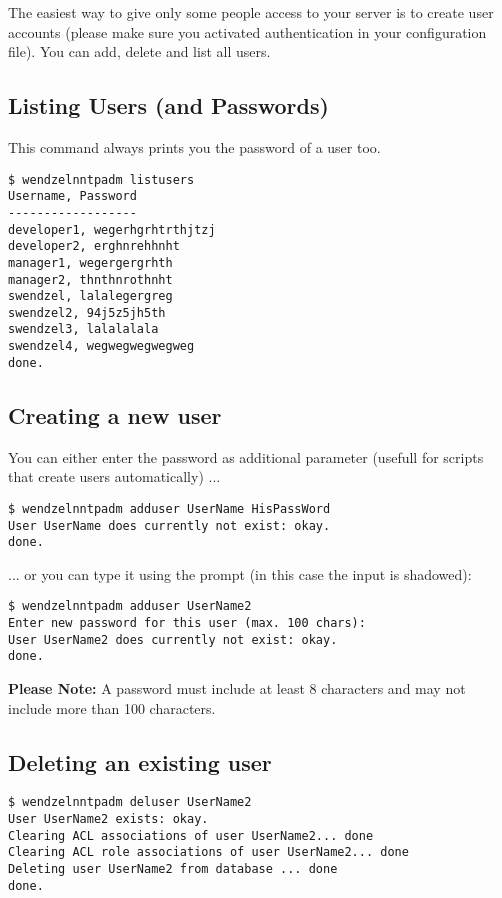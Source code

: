 The easiest way to give only some people access to your server is to create user accounts (please make sure you activated authentication in your configuration file). You can add, delete and list all users.

\subsection{Listing Users (and Passwords)}

This command always prints you the password of a user too.

\begin{verbatim}
$ wendzelnntpadm listusers
Username, Password
------------------
developer1, wegerhgrhtrthjtzj
developer2, erghnrehhnht
manager1, wegergergrhth
manager2, thnthnrothnht
swendzel, lalalegergreg
swendzel2, 94j5z5jh5th
swendzel3, lalalalala
swendzel4, wegwegwegwegweg
done.
\end{verbatim}

\subsection{Creating a new user}

You can either enter the password as additional parameter (usefull for scripts that create users automatically) ...

\begin{verbatim}
$ wendzelnntpadm adduser UserName HisPassWord
User UserName does currently not exist: okay.
done.
\end{verbatim}

... or you can type it using the prompt (in this case the input is shadowed):

\begin{verbatim}
$ wendzelnntpadm adduser UserName2
Enter new password for this user (max. 100 chars):
User UserName2 does currently not exist: okay.
done.
\end{verbatim}

{\bf Please Note:} A password must include at least 8 characters and may not include more than 100 characters.

\subsection{Deleting an existing user}

\begin{verbatim}
$ wendzelnntpadm deluser UserName2
User UserName2 exists: okay.
Clearing ACL associations of user UserName2... done
Clearing ACL role associations of user UserName2... done
Deleting user UserName2 from database ... done
done.
\end{verbatim}

